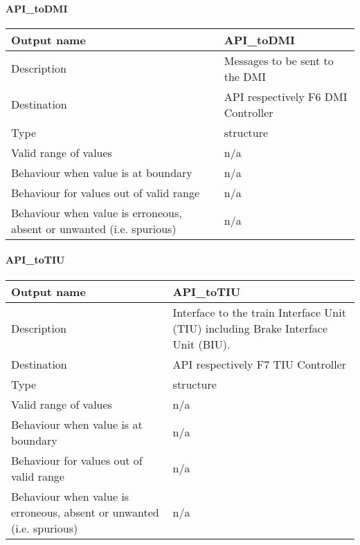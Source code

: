 \paragraph{API\_toDMI}

\begin{longtable}{p{}p{}}
\toprule
Output name				& API\_toDMI \\
\midrule
Description				& Messages to be sent to the DMI \\
\midrule
Destination				& API respectively F6 DMI Controller \\ 
\midrule
Type					& structure\\
\midrule
Valid range of values	& n/a \\
\midrule
Behaviour when value is at boundary	& n/a \\
\midrule
Behaviour for values out of valid range	& n/a\\
\midrule
Behaviour when value is erroneous, absent or unwanted (i.e. spurious) & n/a\\
\bottomrule
\end{longtable}

\paragraph{API\_toTIU}

\begin{longtable}{p{}p{}}
\toprule
Output name				& API\_toTIU \\
\midrule
Description				& Interface to the train Interface Unit (TIU) including Brake Interface Unit (BIU). \\
\midrule
Destination				& API respectively F7 TIU Controller \\ 
\midrule
Type					& structure \\
\midrule
Valid range of values	& n/a \\
\midrule
Behaviour when value is at boundary	& n/a \\
\midrule
Behaviour for values out of valid range	& n/a\\
\midrule
Behaviour when value is erroneous, absent or unwanted (i.e. spurious) & n/a \\
\bottomrule
\end{longtable}
